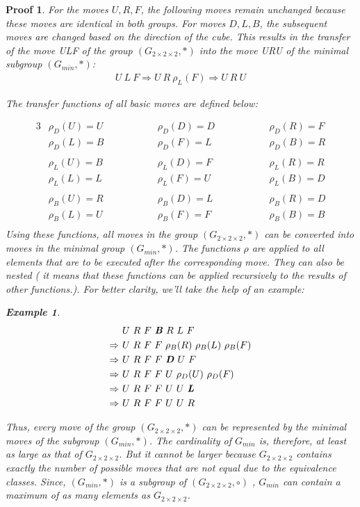 \documentclass[12pt,a4paper]{article}
\theoremstyle{custom}
\newtheorem*{proofcustom}{Proof}
\newtheorem*{example}{Example}
\newcommand{\Gtwo}{\ensuremath{G_{2\times 2\times 2}}}
\begin{document}
\begin{proofcustom}
For the moves $U, R, F$, the following moves remain unchanged because these moves are identical in both groups. For moves $D, L, B$, the subsequent moves are changed based on the direction of the cube. This results in the transfer of the move \textit{ULF} of the group $\left(\Gtwo, \scriptstyle*\right)$ into the move \textit{URU} of the minimal subgroup $\left(G_{min}, \scriptstyle*\right)$:
\begin{align*}
U \ L \ F \Rightarrow U \ R \ \rho_L(F) \Rightarrow U \ R \ U
\end{align*}

The transfer functions of all basic moves are defined below:

\begin{alignat*}{3}
 & \rho_D(U) = U \qquad \qquad  && \rho_D(D) = D  \qquad \qquad && \rho_D(R) = F  \\
 & \rho_D(L) = B    && \rho_D(F) = L    && \rho_D(B) =  R \\
\\
 & \rho_L(U) = B  && \rho_L(D) = F  && \rho_L(R) = R \\
 & \rho_L(L) = L  && \rho_L(F) = U  && \rho_L(B) = D  \\
\\
 & \rho_B(U) = R && \rho_B(D) = L   && \rho_B(R) = D \\
 & \rho_B(L) = U  && \rho_B(F) =  F && \rho_B(B) = B  \\
\end{alignat*}
Using these functions, all moves in the group $\left(\Gtwo, \scriptstyle*\right)$ can be converted into moves in the minimal group $\left(G_{min}, \scriptstyle*\right)$. The functions $\rho$ are applied to all elements that are to be executed after the corresponding move. They can also be nested ( it means that these functions can be applied recursively to the results of other functions.). For better clarity, we'll take the help of an example: 
\begin{example}
 
\begin{align*}
& U \ R \ F \ \textbf{\textit{B}} \ R \ L \ F  \\ 
\Rightarrow \ & U \ R \ F \ F \ \rho_B(R) \ \rho_B(L) \ \rho_B(F) \\
\Rightarrow \ & U \ R \ F \ F \ \textbf{\textit{D}} \ U \ F \\
\Rightarrow \ & U \ R \ F \ F \ U \ \rho_D(U) \ \rho_D(F) \\
\Rightarrow  \ & U \ R \ F \ F \ U \ U \ \textbf{\textit{L}} \\
\Rightarrow \ & U \ R \ F \ F \ U \ U \ R
\end{align*}
\end{example}
Thus, every move of the group $\left(\Gtwo, \scriptstyle*\right)$ can be represented by the minimal moves of the subgroup $\left(G_{min}, \scriptstyle*\right)$. The cardinality of $G_{min}$ is, therefore, at least as large as that of $\Gtwo$. But it cannot be larger because $\Gtwo$ contains exactly the number of possible moves that are not equal due to the equivalence classes. Since, $(G_{min}, \scriptstyle*)$ is a subgroup of $(\Gtwo, \circ)$ , $G_{min}$ can contain a maximum of as many elements as $\Gtwo$.


\end{proofcustom}
\end{document}
